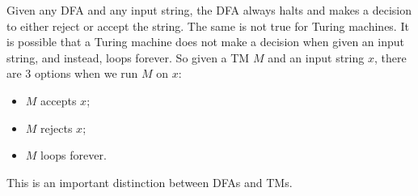 \begin{important} \label{important:Turing-machines-can-loop-forever}
Given any DFA and any input string, the DFA always halts and makes a decision to either reject or accept the string. The same is not true for Turing machines. It is possible that a Turing machine does not make a decision when given an input string, and instead, loops forever. So given a TM $M$ and an input string $x$, there are 3 options when we run $M$ on $x$: 
\begin{itemize}
    \item $M$ accepts $x$;
    \item $M$ rejects $x$;
    \item $M$ loops forever.
\end{itemize}
This is an important distinction between DFAs and TMs.
\end{important}

